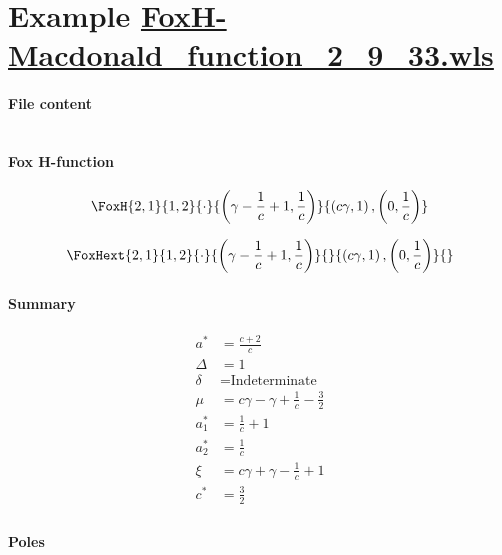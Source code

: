 \documentclass[11pt]{article}
\begin{document}
\section{Example \url{FoxH-Macdonald_function_2_9_33.wls}}

\paragraph{File content}

\inputminted{text}{FoxH-Macdonald_function_2_9_33.wls}

\paragraph{Fox H-function}

\begin{align*}
  \FoxH
    {2,1}
    {1,2}
    {\cdot}
    {\left(\gamma -\frac{1}{c}+1, \frac{1}{c}\right)}
    {\left(c \gamma, 1\right), \left(0, \frac{1}{c}\right)}
\end{align*}

\begin{align*}
  \FoxHext
    {2,1}
    {1,2}
    {\cdot}
    {\left(\gamma -\frac{1}{c}+1, \frac{1}{c}\right)}
    {}
    {\left(c \gamma, 1\right), \left(0, \frac{1}{c}\right)}
    {}
\end{align*}

\paragraph{Summary}

\begin{align*}
  a^*    & = \frac{c+2}{c} \\
  \Delta & = 1 \\
  \delta & = \text{Indeterminate} \\
  \mu    & = c \gamma -\gamma +\frac{1}{c}-\frac{3}{2} \\
  a_1^*  & = \frac{1}{c}+1 \\
  a_2^*  & = \frac{1}{c} \\
  \xi    & = c \gamma +\gamma -\frac{1}{c}+1 \\
  c^*    & = \frac{3}{2} \\
\end{align*}

\paragraph{Poles}
\end{document}
